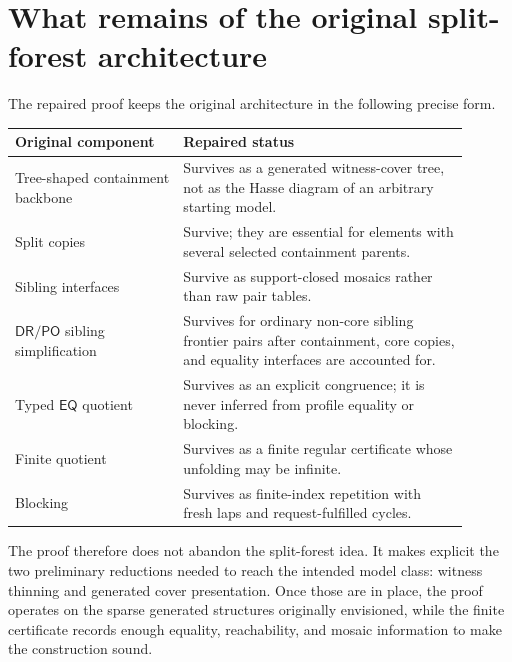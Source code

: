 \documentclass[11pt]{article}
\newcommand{\EQ}{\mathsf{EQ}}
\newcommand{\DR}{\mathsf{DR}}
\newcommand{\PO}{\mathsf{PO}}
\begin{document}
\section{What remains of the original split-forest architecture}

The repaired proof keeps the original architecture in the following precise form.
\begin{center}
\begin{tabular}{p{0.33\linewidth}p{0.57\linewidth}}
\toprule
Original component & Repaired status \\
\midrule
Tree-shaped containment backbone & Survives as a generated witness-cover tree, not as the Hasse diagram of an arbitrary starting model. \\
Split copies & Survive; they are essential for elements with several selected containment parents. \\
Sibling interfaces & Survive as support-closed mosaics rather than raw pair tables. \\
$\DR/\PO$ sibling simplification & Survives for ordinary non-core sibling frontier pairs after containment, core copies, and equality interfaces are accounted for. \\
Typed $\EQ$ quotient & Survives as an explicit congruence; it is never inferred from profile equality or blocking. \\
Finite quotient & Survives as a finite regular certificate whose unfolding may be infinite. \\
Blocking & Survives as finite-index repetition with fresh laps and request-fulfilled cycles. \\
\bottomrule
\end{tabular}
\end{center}

The proof therefore does not abandon the split-forest idea.  It makes explicit the two preliminary reductions needed to reach the intended model class: witness thinning and generated cover presentation.  Once those are in place, the proof operates on the sparse generated structures originally envisioned, while the finite certificate records enough equality, reachability, and mosaic information to make the construction sound.
\end{document}
